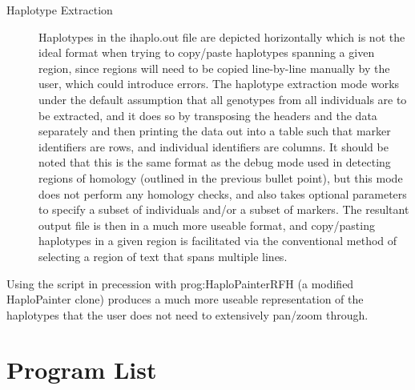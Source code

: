 \begin{description}
\item[Haplotype Extraction]{Haplotypes in the ihaplo.out file are depicted horizontally which is not the ideal format when trying to copy/paste haplotypes spanning a given region, since regions will need to be copied line-by-line manually by the user, which could introduce errors. The haplotype extraction mode works under the default assumption that all genotypes from all individuals are to be extracted, and it does so by transposing the headers and the data separately and then printing the data out into a table such that marker identifiers are rows, and individual identifiers are columns. It should be noted that this is the same format as the debug mode used in detecting regions of homology (outlined in the previous bullet point), but this mode does not perform any homology checks, and also takes optional parameters to specify a subset of individuals and/or a subset of markers. The resultant output file is then in a much more useable format, and copy/pasting haplotypes in a given region is facilitated via the conventional method of selecting a region of text that spans multiple lines.}
\end{description}

Using the script in precession with \gls{prog:HaploPainterRFH} (a modified HaploPainter clone) produces a much more useable representation of the haplotypes that the user does not need to extensively pan/zoom through. 



\section{Program List}
\label{ref:meth:proglist}

\printglossaries[type=programs]
